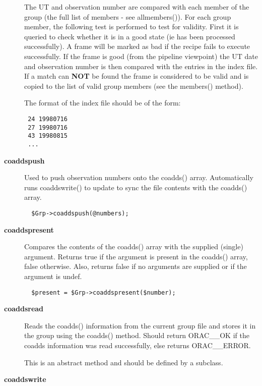 \begin{description}
The UT and observation number are compared with each member of
the group (the full list of members - see allmembers()).
For each group member, the following test is performed to test
for validity. First it is queried to check whether it is in a
good state (ie has been processed successfully). 
A frame will be marked as bad if the recipe fails to execute
successfully. If the frame is good (from the pipeline viewpoint)
the UT date and observation number is then compared with the
entries in the index file. If a match can \textbf{NOT} be found the
frame is considered to be valid and is copied to the list of valid
group members (see the members() method).



The format of the index file should be of the form:

\begin{verbatim}
 24 19980716 
 27 19980716 
 43 19980815 
 ...
\end{verbatim}
\item[\textbf{coaddspush}] \mbox{}

Used to push observation numbers onto the coadds() array. Automatically
runs coaddswrite() to update to sync the file contents with the coadds()
array.

\begin{verbatim}
  $Grp->coaddspush(@numbers);
\end{verbatim}
\item[\textbf{coaddspresent}] \mbox{}

Compares the contents of the coadds() array with the supplied (single)
argument. Returns true if the argument is present in the coadds()
array, false otherwise. Also, returns false if no arguments are supplied
or if the argument is undef.

\begin{verbatim}
  $present = $Grp->coaddspresent($number);
\end{verbatim}
\item[\textbf{coaddsread}] \mbox{}

Reads the coadds() information from the current group file and stores
it in the group using the coadds() method.
Should return ORAC\_\_OK if the coadds information was read successfully,
else returns ORAC\_\_ERROR.



This is an abstract method and should be defined by a subclass.

\item[\textbf{coaddswrite}] \mbox{}


\end{description}
